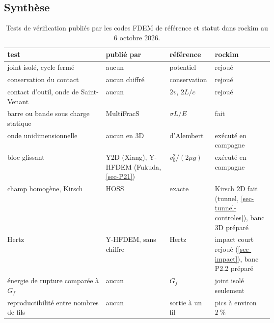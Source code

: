\subsection{Synthèse}

\begin{table}[htbp]
\centering
\caption{Tests de vérification publiés par les codes FDEM de référence et statut dans rockim au 6 octobre 2026.}
\label{tab-tests-standard}
\small
\begin{tabularx}{\linewidth}{@{}>{\raggedright\arraybackslash}X >{\raggedright\arraybackslash}p{0.24\linewidth} >{\raggedright\arraybackslash}p{0.17\linewidth} >{\raggedright\arraybackslash}p{0.22\linewidth}@{}}
\toprule
test & publié par & référence & rockim \\
\midrule
joint isolé, cycle fermé & aucun & potentiel & rejoué \\
conservation du contact & aucun chiffré & conservation & rejoué \\
contact d'outil, onde de Saint-Venant & aucun & $2v$, $2L/c$ & rejoué \\
barre ou bande sous charge statique & MultiFracS & $\sigma L/E$ & fait \\
onde unidimensionnelle & aucun en 3D & d'Alembert & exécuté en campagne \\
bloc glissant & Y2D (Xiang), Y-HFDEM (Fukuda, \cref{sec-P21}) & $v_0^2/(2\mu g)$ & exécuté en campagne \\
champ homogène, Kirsch & HOSS & exacte & Kirsch 2D fait (tunnel, \cref{sec-tunnel-controles}), banc 3D préparé \\
Hertz & Y-HFDEM, sans chiffre & Hertz & impact court rejoué (\cref{sec-impact}), banc P2.2 préparé \\
énergie de rupture comparée à $G_f$ & aucun & $G_f$ & joint isolé seulement \\
reproductibilité entre nombres de fils & aucun & sortie à un fil & pics à environ $2~\%$ \\
\bottomrule
\end{tabularx}
\end{table}
